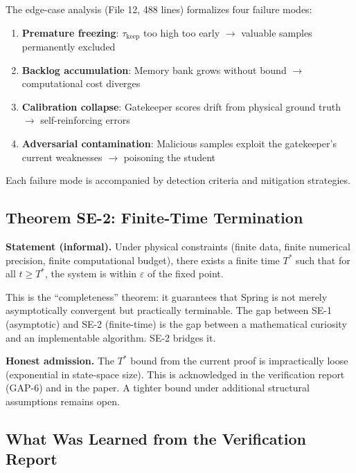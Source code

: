 \documentclass[12pt,a4paper]{ctexart}
\begin{document}
The edge-case analysis (File 12, 488 lines) formalizes four failure modes:
\begin{enumerate}
\item \textbf{Premature freezing}: $\tau_{\text{keep}}$ too high too early $\to$ valuable samples permanently excluded
\item \textbf{Backlog accumulation}: Memory bank grows without bound $\to$ computational cost diverges
\item \textbf{Calibration collapse}: Gatekeeper scores drift from physical ground truth $\to$ self-reinforcing errors
\item \textbf{Adversarial contamination}: Malicious samples exploit the gatekeeper's current weaknesses $\to$ poisoning the student
\end{enumerate}

Each failure mode is accompanied by detection criteria and mitigation strategies.

\subsection{Theorem SE-2: Finite-Time Termination}

\textbf{Statement (informal).} Under physical constraints (finite data, finite numerical precision, finite computational budget), there exists a finite time $T^*$ such that for all $t \geq T^*$, the system is within $\varepsilon$ of the fixed point.

This is the ``completeness'' theorem: it guarantees that Spring is not merely asymptotically convergent but practically terminable. The gap between SE-1 (asymptotic) and SE-2 (finite-time) is the gap between a mathematical curiosity and an implementable algorithm. SE-2 bridges it.

\textbf{Honest admission.} The $T^*$ bound from the current proof is impractically loose (exponential in state-space size). This is acknowledged in the verification report (GAP-6) and in the paper. A tighter bound under additional structural assumptions remains open.

\subsection{What Was Learned from the Verification Report}
\end{document}
